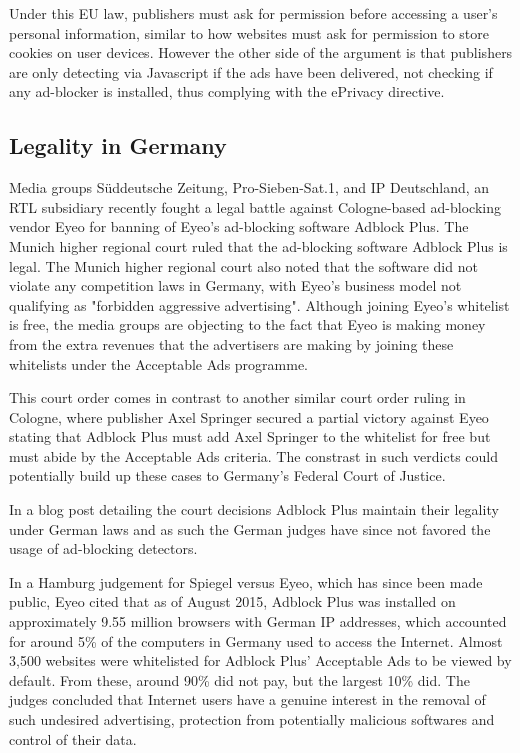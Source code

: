 \documentclass[runningheads,a4paper]{llncs}
\begin{document}
Under this EU law, publishers must ask for permission before accessing a user's personal information, similar to how websites must ask for permission to store cookies on user devices. However the other side of the argument is that publishers are only detecting via Javascript if the ads have been delivered, not checking if any ad-blocker is installed, thus complying with the ePrivacy directive.

\subsection{Legality in Germany}

Media groups Süddeutsche Zeitung, Pro-Sieben-Sat.1, and IP Deutschland, an RTL subsidiary recently fought a legal battle against Cologne-based ad-blocking vendor Eyeo for banning of Eyeo's ad-blocking software Adblock Plus. The Munich higher regional court ruled \cite{wiredLegal} that the ad-blocking software Adblock Plus is legal. The Munich higher regional court also noted that the software did not violate any competition laws in Germany, with Eyeo’s business model not qualifying as "forbidden aggressive advertising". Although joining Eyeo's whitelist is free, the media groups are objecting to the fact that Eyeo is making money from the extra revenues that the advertisers are making by joining these whitelists under the Acceptable Ads programme.

This court order comes in contrast to another similar court order ruling in Cologne, where publisher Axel Springer secured a partial victory \cite{springerLoss} against Eyeo stating that Adblock Plus must add Axel Springer to the whitelist for free but must abide by the Acceptable Ads criteria. The constrast in such verdicts could potentially build up these cases to Germany’s Federal Court of Justice.

In a blog post detailing the court decisions \cite{adblockLegal} Adblock Plus maintain their legality under German laws and as such the German judges have since not favored the usage of ad-blocking detectors. 

In a Hamburg judgement for Spiegel versus Eyeo, which has since been made public, Eyeo cited \cite{hamburgJudgement} that as of August 2015, Adblock Plus was installed on approximately 9.55 million browsers with German IP addresses, which accounted for around 5\% of the computers in Germany used to access the Internet. Almost 3,500 websites were whitelisted for Adblock Plus' Acceptable Ads to be viewed by default. From these, around 90\% did not pay, but the largest 10\% did. The judges concluded that Internet users have a genuine interest in the removal of such undesired advertising, protection from potentially malicious softwares and control of their data.
\end{document}
